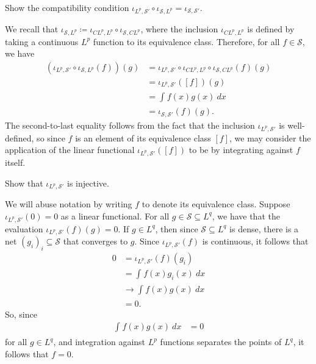 \documentclass[10pt]{mypackage}
\renewcommand{\coloneq}{\coloneqq}
\begin{document}
\begin{problem}
  Show the compatibility condition $\iota_{L^p,\mathscr{S}'}\circ \iota_{\mathscr{S},L^p} = \iota_{\mathscr{S},\mathscr{S}'}$.
\end{problem}
\begin{solution}
  We recall that $ \iota_{ \mathscr{S},L^p }\coloneq \iota_{ CL^p,L^p }\circ \iota_{ \mathscr{S},CL^p } $, where the inclusion $ \iota_{CL^p,L^p} $ is defined by taking a continuous $L^p$ function to its equivalence class. Therefore, for all $f\in \mathscr{S}$, we have
  \begin{align*}
    \left( \iota_{L^p,\mathscr{S}'}\circ \iota_{\mathscr{S},L^p}(f) \right)(g) &= \iota_{L^p,\mathscr{S}'}\circ \iota_{CL^p,L^p}\circ \iota_{\mathscr{S},CL^p}(f)(g)\\
                                                                     &= \iota_{L^p,\mathscr{S}'}\left( \left[ f \right] \right)(g)\\
                                                                     &= \int_{}^{} f(x)g(x)\:dx\\
                                                                     &= \iota_{\mathscr{S},\mathscr{S}'}(f)(g).
  \end{align*}
  The second-to-last equality follows from the fact that the inclusion $\iota_{L^p,\mathscr{S}'}$ is well-defined, so since $f$ is an element of its equivalence class $\left[ f \right]$, we may consider the application of the linear functional $\iota_{L^p,\mathscr{S}'}\left( \left[ f \right] \right)$ to be by integrating against $f$ itself.
\end{solution}
\begin{problem}
  Show that $\iota_{L^p,\mathscr{S}'}$ is injective.
\end{problem}
\begin{solution}
  We will abuse notation by writing $f$ to denote its equivalence class. Suppose $\iota_{L^p,\mathscr{S}'}\left( 0 \right) = 0$ as a linear functional. For all $g\in \mathscr{S}\subseteq L^q$, we have that the evaluation $ \iota_{L^p,\mathscr{S}'}(f)(g) = 0$. If $g\in L^q$, then since $ \mathscr{S}\subseteq L^q $ is dense, there is a net $\left( g_i \right)_i\subseteq \mathscr{S}$ that converges to $g$. Since $\iota_{L^p,\mathscr{S}'}\left( f \right)$ is continuous, it follows that
  \begin{align*}
    0 &= \iota_{L^p,\mathscr{S}'}\left( f \right)\left( g_i \right)\\
      &= \int_{}^{} f(x)g_i(x)\:dx\\
      &\to \int_{}^{} f(x)g(x)\:dx\\
      &= 0.
  \end{align*}
  So, since
  \begin{align*}
    \int_{}^{} f(x)g(x)\:dx &= 0
  \end{align*}
  for all $g\in L^q$, and integration against $L^p$ functions separates the points of $L^q$, it follows that $f = 0$.
\end{solution}
\end{document}

